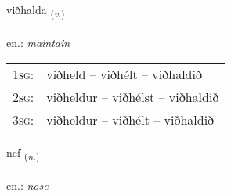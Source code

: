 \documentclass[frontgrid, backgrid]{flacards}\usepackage[]{graphicx}\usepackage[]{xcolor}
\begin{document}
\renewcommand{\blhead}{\vskip5pt {\small\bfseries\footnotesize Sagnorð | Verb }}
\renewcommand{\bcfoot}{\vskip5pt \hspace{2pt}{\small\bfseries\footnotesize 2K}}


{viðhalda \small{\textsubscript{(\textit{v.})}} \\[1ex] %
\textphonetic{[vɪθhalta]} \\
en.: \emph{maintain} \\  [2ex]
\renewcommand*{\arraystretch}{0.8}
\begin{tabular}{p{1cm}l}
\textsc{1sg}: & viðheld -- viðhélt -- viðhaldið \\ 
\textsc{2sg}: & viðheldur -- viðhélst -- viðhaldið \\ 
\textsc{3sg}: & viðheldur -- viðhélt -- viðhaldið \\ 
\end{tabular}
}

\renewcommand{\flhead}{\vskip5pt \fboxsep=0pt {\small\bfseries\footnotesize Nafnorð | Noun}}
\renewcommand{\fcfoot}{\vskip5pt \fboxsep=0pt \hspace{2pt}{\small\bfseries\footnotesize 2K}}

\renewcommand{\blhead}{\vskip5pt {\small\bfseries\footnotesize Nafnorð | Noun }}
\renewcommand{\bcfoot}{\vskip5pt \hspace{2pt}{\small\bfseries\footnotesize 2K}}


{nef \small{\textsubscript{(\textit{n.})}} \\[1ex] %
\textphonetic{[nɛːv]} \\
en.: \emph{nose} \\  [2ex]
\renewcommand*{\arraystretch}{0.8}
}

\renewcommand{\flhead}{\vskip5pt \fboxsep=0pt {\small\bfseries\footnotesize Nafnorð | Noun}}
\renewcommand{\fcfoot}{\vskip5pt \fboxsep=0pt \hspace{2pt}{\small\bfseries\footnotesize 2K}}
\end{document}
